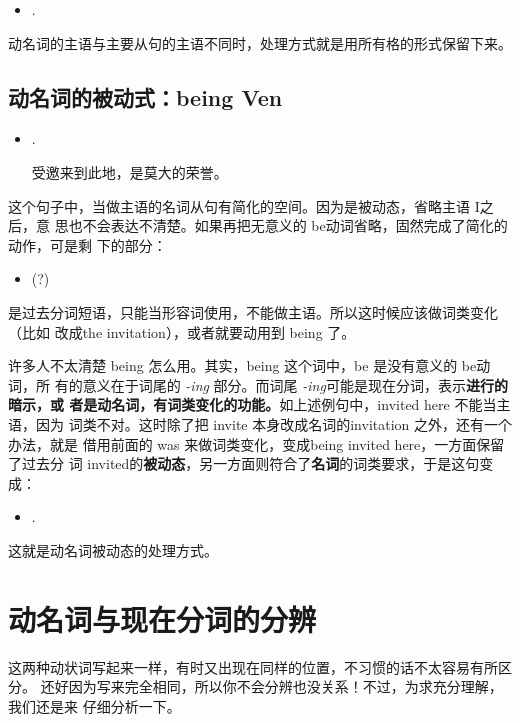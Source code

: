 \begin{itemize}
\item  {}  .
\end{itemize}

动名词的主语与主要从句的主语不同时，处理方式就是用所有格的形式保留下来。

\subsection{动名词的被动式：being Ven}

\begin{itemize}
\item {}  .

受邀来到此地，是莫大的荣誉。
\end{itemize}

这个句子中，当做主语的名词从句有简化的空间。因为是被动态，省略主语 I之后，意
思也不会表达不清楚。如果再把无意义的 be动词省略，固然完成了简化的动作，可是剩
下的部分：

\begin{itemize}
\item {} (?)
\end{itemize}
是过去分词短语，只能当形容词使用，不能做主语。所以这时候应该做词类变化（比如
改成the invitation），或者就要动用到 being 了。

许多人不太清楚 being 怎么用。其实，being 这个词中，be 是没有意义的 be动词，所
有的意义在于词尾的 \emph{-ing} 部分。而词尾 \emph{-ing}可能是现在分词，表示\textbf{进行的暗示，或
  者是动名词，有词类变化的功能。}如上述例句中，invited here 不能当主语，因为
词类不对。这时除了把 invite 本身改成名词的invitation 之外，还有一个办法，就是
借用前面的 was 来做词类变化，变成being invited here，一方面保留了过去分
词 invited的\textbf{被动态}，另一方面则符合了\textbf{名词}的词类要求，于是这句变成：
\begin{itemize}
\item {}  .
\end{itemize}

这就是动名词被动态的处理方式。

\section{动名词与现在分词的分辨}

这两种动状词写起来一样，有时又出现在同样的位置，不习惯的话不太容易有所区分。
还好因为写来完全相同，所以你不会分辨也没关系！不过，为求充分理解，我们还是来
仔细分析一下。

